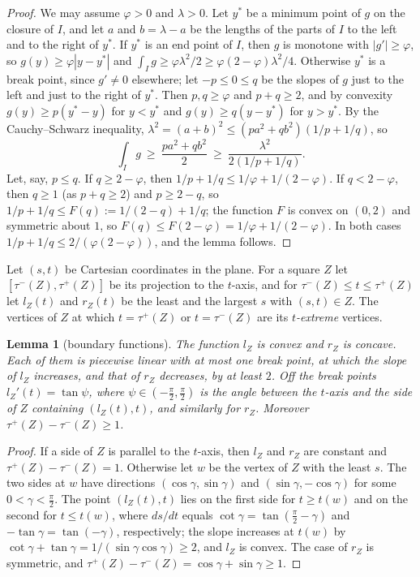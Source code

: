 \documentclass[11pt]{amsart}
\newtheorem{lemma}[theorem]{Lemma}
\theoremstyle{definition}
\theoremstyle{remark}
\begin{document}
\begin{proof}
We may assume $\varphi>0$ and $\lambda>0$. Let $y^*$ be a minimum point of $g$ on the closure of $I$, and let $a$ and
$b=\lambda-a$ be the lengths of the parts of $I$ to the left and to the right of $y^*$. If $y^*$ is an end point of $I$, then
$g$ is monotone with $|g'|\ge\varphi$, so $g(y)\ge\varphi|y-y^*|$ and $\int_Ig\ge\varphi\lambda^2/2\ge\varphi(2-\varphi)\lambda^2/4$.
Otherwise $y^*$ is a break point, since $g'\ne0$ elsewhere; let $-p\le0\le q$ be the slopes of $g$ just to the left and just
to the right of $y^*$. Then $p,q\ge\varphi$ and $p+q\ge2$, and by convexity $g(y)\ge p(y^*-y)$ for $y<y^*$ and
$g(y)\ge q(y-y^*)$ for $y>y^*$. By the Cauchy--Schwarz inequality, $\lambda^2=(a+b)^2\le(pa^2+qb^2)(1/p+1/q)$, so
\[
\int_Ig\ \ge\ \frac{pa^2+qb^2}2\ \ge\ \frac{\lambda^2}{2(1/p+1/q)} .
\]
Let, say, $p\le q$. If $q\ge2-\varphi$, then $1/p+1/q\le1/\varphi+1/(2-\varphi)$. If $q<2-\varphi$, then $q\ge1$ (as
$p+q\ge2$) and $p\ge2-q$, so $1/p+1/q\le F(q):=1/(2-q)+1/q$; the function $F$ is convex on $(0,2)$ and symmetric about $1$,
so $F(q)\le F(2-\varphi)=1/\varphi+1/(2-\varphi)$. In both cases $1/p+1/q\le2/(\varphi(2-\varphi))$, and the lemma follows.
\end{proof}

Let $(s,t)$ be Cartesian coordinates in the plane. For a square $Z$ let $[\tau^-(Z),\tau^+(Z)]$ be its projection to the
$t$-axis, and for $\tau^-(Z)\le t\le\tau^+(Z)$ let $l_Z(t)$ and $r_Z(t)$ be the least and the largest $s$ with $(s,t)\in Z$.
The vertices of $Z$ at which $t=\tau^+(Z)$ or $t=\tau^-(Z)$ are its \emph{$t$-extreme} vertices.

\begin{lemma}[boundary functions]\label{lem:bd}
The function $l_Z$ is convex and $r_Z$ is concave. Each of them is piecewise linear with at most one break point, at which
the slope of $l_Z$ increases, and that of $r_Z$ decreases, by at least $2$. Off the break points $l_Z'(t)=\tan\psi$, where
$\psi\in(-\frac\pi2,\frac\pi2)$ is the angle between the $t$-axis and the side of $Z$ containing $(l_Z(t),t)$, and similarly
for $r_Z$. Moreover $\tau^+(Z)-\tau^-(Z)\ge1$.
\end{lemma}

\begin{proof}
If a side of $Z$ is parallel to the $t$-axis, then $l_Z$ and $r_Z$ are constant and $\tau^+(Z)-\tau^-(Z)=1$. Otherwise let
$w$ be the vertex of $Z$ with the least $s$. The two sides at $w$ have directions $(\cos\gamma,\sin\gamma)$ and
$(\sin\gamma,-\cos\gamma)$ for some $0<\gamma<\frac\pi2$. The point $(l_Z(t),t)$ lies on the first side for $t\ge t(w)$ and on
the second for $t\le t(w)$, where $ds/dt$ equals $\cot\gamma=\tan(\frac\pi2-\gamma)$ and $-\tan\gamma=\tan(-\gamma)$,
respectively; the slope increases at $t(w)$ by $\cot\gamma+\tan\gamma=1/(\sin\gamma\cos\gamma)\ge2$, and $l_Z$ is
convex. The case of $r_Z$ is symmetric, and $\tau^+(Z)-\tau^-(Z)=\cos\gamma+\sin\gamma\ge1$.
\end{proof}
\end{document}
